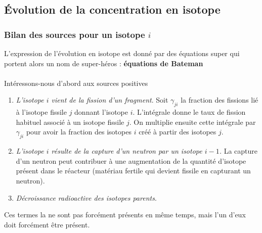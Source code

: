 	\subsection{Évolution de la concentration en isotope}
		\subsubsection{Bilan des sources pour un isotope $i$}
		L'expression de l'évolution en isotope est donné par des équations super qui portent alors un 
		nom de super-héros : \textbf{équations de Bateman}\\
		
		\ \\
		
		Intéressons-nous d'abord aux sources positives
		\begin{enumerate}
		\item \textit{L'isotope $i$ vient de la fission d'un fragment}. Soit $\gamma_{ji}$ la fraction
		 des 
		fissions lié à l'isotope fissile $j$ donnant l'isotope $i$. L'intégrale donne le taux 
		de fission habituel associé à un isotope fissile $j$. On multiplie ensuite cette intégrale 
		par $\gamma_{ji}$ pour avoir la fraction des isotopes $i$ créé à partir des isotopes $j$.
		\item \textit{L'isotope $i$ résulte de la capture d'un neutron par un isotope $ i-1$.} La 
		capture d'un neutron peut contribuer à une augmentation de la quantité d'isotope présent dans 
		le réacteur (matériau fertile qui devient fissile en capturant un neutron).
		\item \textit{Décroissance radioactive des isotopes parents}. 
		\end{enumerate}
		Ces termes la ne sont pas forcément présents en même temps, mais l'un d'eux doit forcément
		être présent.\\
		
